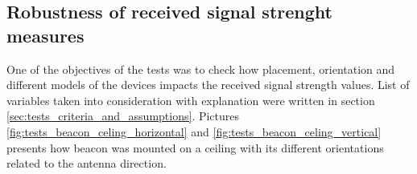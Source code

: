 \documentclass[../main.tex]{subfiles}
\begin{document}
\FloatBarrier

\subsection{Robustness of received signal strenght measures} %
\label{sub:robustness_of_received_signal_strenght_measures}


One of the objectives of the tests was to check how placement, orientation and different models of the devices impacts the received signal strength values. List of variables taken into consideration with explanation were written in section \ref{sec:tests_criteria_and_assumptions}. Pictures \ref{fig:tests_beacon_celing_horizontal} and \ref{fig:tests_beacon_celing_vertical} presents how beacon was mounted on a ceiling with its different orientations related to the antenna direction.
\end{document}
